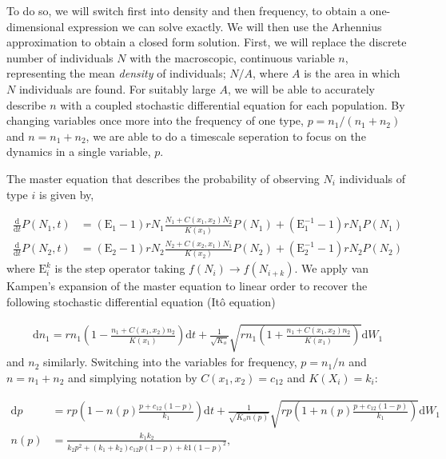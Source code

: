 \documentclass[authoryear,review,11pt]{elsarticle}
\newcommand{\ud}{\mathrm{d}}
\newcommand{\E}{\text{E}}
\begin{document}
To do so, we will switch first into density and then frequency, to obtain a one-dimensional expression we can solve exactly.  We will then use the Arhennius approximation to obtain a closed form solution.  First, we will replace the discrete number of individuals $N$ with the macroscopic, continuous variable $n$, representing the mean \emph{density} of individuals; $N/A$, where $A$ is the area in which $N$ individuals are found.  For suitably large $A$, we will be able to accurately describe $n$ with a coupled stochastic differential equation for each population.  By changing variables once more into the frequency of one type, $p = n_1/(n_1+n_2)$ and $n = n_1 + n_2$, we are able to do a timescale seperation to focus on the dynamics in a single variable, $p$.  


The master equation that describes the probability of observing $N_i$ individuals of type $i$ is given by,

\begin{align}
\frac{\ud}{\ud t} P(N_1,t) &= (\E_1 - 1) r N_1 \frac{N_1 + C(x_1, x_2) N_2}{K(x_1) }P(N_1) + (\E_1^{-1} - 1)r N_1 P(N_1) \nonumber \\
\frac{\ud}{\ud t} P(N_2,t) &= (\E_2 - 1) r N_2 \frac{N_2 + C(x_2, x_1) N_1}{K(x_2) }P(N_2) + (\E_2^{-1} - 1)r N_2 P(N_2)
\label{mastereq}
\end{align}
where $\E_i^k$ is the step operator taking $f(N_i) \to f(N_{i+k})$.  We apply van Kampen's expansion of the master equation to linear order to recover the following stochastic differential equation (It\^o equation)

\begin{align}
\ud n_1 = r n_1 \left(1 -  \frac{n_1 + C(x_1, x_2) n_2}{K(x_1) } \right) \ud t + \frac{1}{\sqrt{K_o} } \sqrt{r n_1 \left(1 +  \frac{n_1 + C(x_1, x_2) n_2}{K(x_1) } \right) } \ud W_1
\label{sde}
\end{align}
and $n_2$ similarly.  Switching into the variables for frequency, $p = n_1/n$ and $n = n_1+n_2$ and simplying notation by $C(x_1, x_2) = c_{12}$ and $K(X_i) = k_i$:

\begin{align}
\ud p &= r p \left(1 -  n(p) \frac{p + c_{12}(1-p) }{k_1 } \right) \ud t + \frac{1}{\sqrt{K_o n(p)} } \sqrt{r p \left(1 +  n(p)\frac{p + c_{12} (1-p) }{k_1 } \right) } \ud W_1  \label{freq_sde} \\
n(p) &=  \frac{k_1 k_2}{k_2 p^2 + (k_1+k_2) c_{12} p (1-p) + k1 (1-p)^2 }, 
\end{align}
\end{document}
